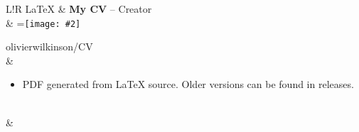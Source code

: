 \documentclass[a4paper,12pt]{article}
\newcommand\VerticalRule{\color{lightgray}\vrule width 0.5pt}
\newcommand{\Icon}[2][0.5cm]{
	\begingroup
	\setbox0=\hbox{\texttt{[image: \#2]}}
	\parbox{\wd0}{\box0}
	\endgroup
}
\begin{document}
\begin{tabular}{L!{\VerticalRule}R}
	LaTeX        & {\bf My CV}  --  Creator                                                           \\
	             & \Icon{github} \hspace{0.1mm} olivierwilkinson/CV                                   \\
	             & \begin{itemize}
		               \item PDF generated from LaTeX source. Older versions can be found in releases.
	               \end{itemize}                         \\
	             &                                                                                    \\
\end{tabular}
\end{document}
